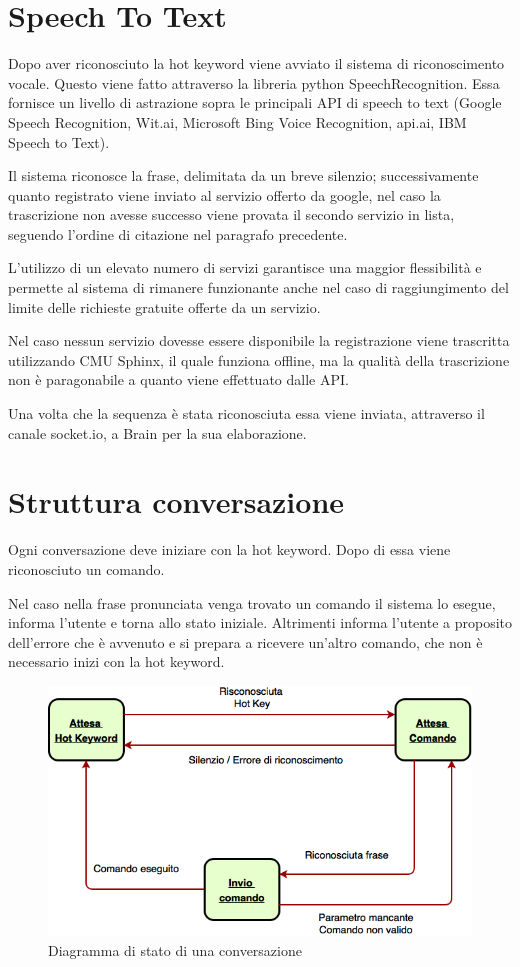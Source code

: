 \documentclass[twoside]{supsistudent}
\begin{document}
\section{Speech To Text}
Dopo aver riconosciuto la hot keyword viene avviato il sistema di riconoscimento vocale. Questo viene fatto attraverso la libreria python SpeechRecognition. Essa fornisce un livello di astrazione sopra le principali API di speech to text (Google Speech Recognition, Wit.ai, Microsoft Bing Voice Recognition, api.ai, IBM Speech to Text).\cite{python-Speech-Recognizer}

Il sistema riconosce la frase, delimitata da un breve silenzio; successivamente quanto registrato viene inviato al servizio offerto da google, nel caso la trascrizione non avesse successo viene provata il secondo servizio in lista, seguendo l'ordine di citazione nel paragrafo precedente.  

L'utilizzo di un elevato numero di servizi garantisce una maggior flessibilità e permette al sistema di rimanere funzionante anche nel caso di raggiungimento del limite delle richieste gratuite offerte da un servizio.

Nel caso nessun servizio dovesse essere disponibile la registrazione viene trascritta utilizzando CMU Sphinx, il quale funziona offline, ma la qualità della trascrizione non è paragonabile a quanto viene effettuato dalle API.

Una volta che la sequenza è stata riconosciuta essa viene inviata, attraverso il canale socket.io, a Brain per la sua elaborazione.
\section{Struttura conversazione}

Ogni conversazione deve iniziare con la hot keyword. Dopo di essa viene riconosciuto un comando.

Nel caso nella frase pronunciata venga trovato un comando il sistema lo esegue, informa l'utente e torna allo stato iniziale.
Altrimenti informa l'utente a proposito dell'errore che è avvenuto e si prepara a ricevere un'altro comando, che non è necessario inizi con la hot keyword.
\begin{figure}[H]
\centering
\includegraphics[width=\textwidth]{Conversation}
\caption{Diagramma di stato di una conversazione}
\label{fig:pose}
\end{figure}
\end{document}
